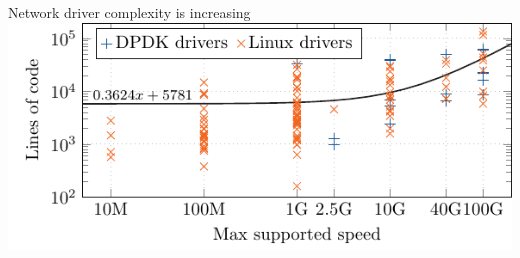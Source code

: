 \documentclass[NET,english,aspectratio=169,notitleframe]{tumbeamer}
\begin{document}
\begin{frame}{Network driver complexity is increasing}
\centering\includegraphics[scale=1.1]{figures/drivers-loc-scatterplot}
\end{frame}
\end{document}

